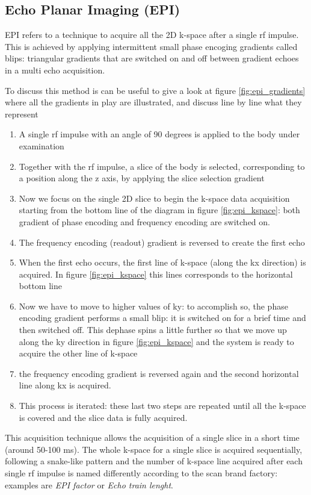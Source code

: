 \documentclass[11pt]{report}
\begin{document}
\subsection{Echo Planar Imaging (EPI)}\label{sec:epi}
EPI refers to a technique to acquire all the 2D k-space after a single rf impulse. This is achieved by applying intermittent small phase encoging gradients called blips: triangular gradients that are switched on and off between gradient echoes in a multi echo acquisition.

To discuss this method is can be useful to give a look at figure \ref{fig:epi_gradients} where all the gradients in play are illustrated, and discuss line by line what they represent
\begin{enumerate}
\item A single rf impulse with an angle of 90 degrees is applied to the body under examination
\item Together with the rf impulse, a slice of the body is selected, corresponding to a position along the z axis, by applying the slice selection gradient
\item Now we focus on the single 2D slice to begin the k-space data acquisition starting from the bottom line of the diagram in figure \ref{fig:epi_kspace}: both gradient of phase encoding and frequency encoding are switched on.
\item The frequency encoding (readout) gradient is reversed to create the first echo
\item When the first echo occurs, the first line of k-space (along the kx direction) is acquired. In figure \ref{fig:epi_kspace} this lines corresponds to the horizontal bottom line
\item Now we have to move to higher values of ky: to accomplish so, the phase encoding gradient performs a small blip: it is switched on for a brief time and then switched off. This dephase spins a little further so that we move up along the ky direction in figure \ref{fig:epi_kspace} and the system is ready to acquire the other line of k-space
\item the frequency encoding gradient is reversed again and the second horizontal line along kx is acquired.
\item This process is iterated: these last two steps are repeated until all the k-space is covered and the slice data is fully acquired.
\end{enumerate}

This acquisition technique allows the acquisition of a single slice in a short time (around 50-100 ms). The whole k-space for a single slice is acquired sequentially, following a snake-like pattern and the number of k-space line acquired after each single rf impulse is named differently according to the scan brand factory: examples are \emph{EPI factor} or \emph{Echo train lenght}.
\end{document}
